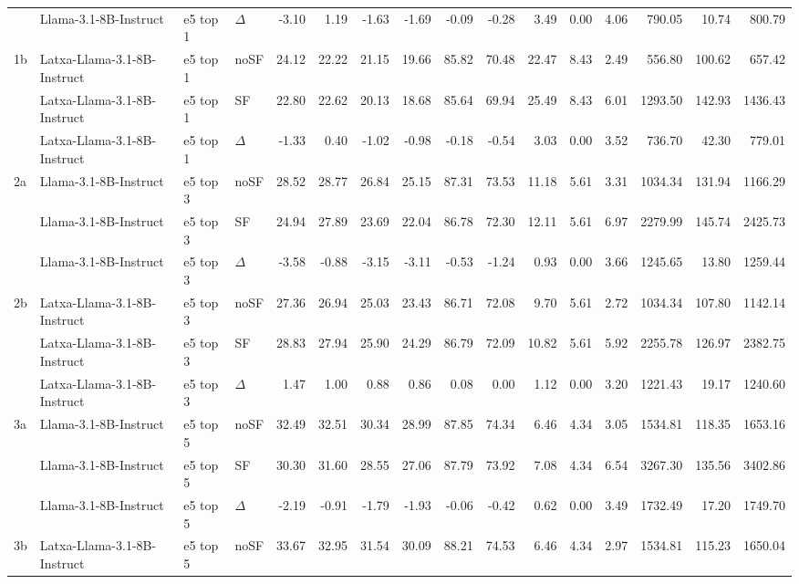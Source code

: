\begin{landscape}
\begin{footnotesize}
\begin{longtable}{l l l l r r r r r r r r r r r r}
 & Llama-3.1-8B-Instruct & e5 top 1 & $\Delta$ & -3.10 & 1.19 & -1.63 & -1.69 & -0.09 & -0.28 & 3.49 & 0.00 & 4.06 & 790.05 & 10.74 & 800.79 \\
1b & Latxa-Llama-3.1-8B-Instruct & e5 top 1 & noSF & 24.12 & 22.22 & 21.15 & 19.66 & 85.82 & 70.48 & 22.47 & 8.43 & 2.49 & 556.80 & 100.62 & 657.42 \\
 & Latxa-Llama-3.1-8B-Instruct & e5 top 1 & SF & 22.80 & 22.62 & 20.13 & 18.68 & 85.64 & 69.94 & 25.49 & 8.43 & 6.01 & 1293.50 & 142.93 & 1436.43 \\
 & Latxa-Llama-3.1-8B-Instruct & e5 top 1 & $\Delta$ & -1.33 & 0.40 & -1.02 & -0.98 & -0.18 & -0.54 & 3.03 & 0.00 & 3.52 & 736.70 & 42.30 & 779.01 \\
\midrule
2a & Llama-3.1-8B-Instruct & e5 top 3 & noSF & 28.52 & 28.77 & 26.84 & 25.15 & 87.31 & 73.53 & 11.18 & 5.61 & 3.31 & 1034.34 & 131.94 & 1166.29 \\
 & Llama-3.1-8B-Instruct & e5 top 3 & SF & 24.94 & 27.89 & 23.69 & 22.04 & 86.78 & 72.30 & 12.11 & 5.61 & 6.97 & 2279.99 & 145.74 & 2425.73 \\
 & Llama-3.1-8B-Instruct & e5 top 3 & $\Delta$ & -3.58 & -0.88 & -3.15 & -3.11 & -0.53 & -1.24 & 0.93 & 0.00 & 3.66 & 1245.65 & 13.80 & 1259.44 \\
2b & Latxa-Llama-3.1-8B-Instruct & e5 top 3 & noSF & 27.36 & 26.94 & 25.03 & 23.43 & 86.71 & 72.08 & 9.70 & 5.61 & 2.72 & 1034.34 & 107.80 & 1142.14 \\
 & Latxa-Llama-3.1-8B-Instruct & e5 top 3 & SF & 28.83 & 27.94 & 25.90 & 24.29 & 86.79 & 72.09 & 10.82 & 5.61 & 5.92 & 2255.78 & 126.97 & 2382.75 \\
 & Latxa-Llama-3.1-8B-Instruct & e5 top 3 & $\Delta$ & 1.47 & 1.00 & 0.88 & 0.86 & 0.08 & 0.00 & 1.12 & 0.00 & 3.20 & 1221.43 & 19.17 & 1240.60 \\
\midrule
3a & Llama-3.1-8B-Instruct & e5 top 5 & noSF & 32.49 & 32.51 & 30.34 & 28.99 & 87.85 & 74.34 & 6.46 & 4.34 & 3.05 & 1534.81 & 118.35 & 1653.16 \\
 & Llama-3.1-8B-Instruct & e5 top 5 & SF & 30.30 & 31.60 & 28.55 & 27.06 & 87.79 & 73.92 & 7.08 & 4.34 & 6.54 & 3267.30 & 135.56 & 3402.86 \\
 & Llama-3.1-8B-Instruct & e5 top 5 & $\Delta$ & -2.19 & -0.91 & -1.79 & -1.93 & -0.06 & -0.42 & 0.62 & 0.00 & 3.49 & 1732.49 & 17.20 & 1749.70 \\
3b & Latxa-Llama-3.1-8B-Instruct & e5 top 5 & noSF & 33.67 & 32.95 & 31.54 & 30.09 & 88.21 & 74.53 & 6.46 & 4.34 & 2.97 & 1534.81 & 115.23 & 1650.04 \\

\end{longtable}
\end{footnotesize}
\end{landscape}
